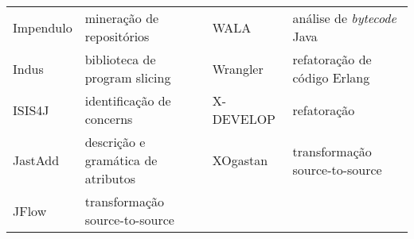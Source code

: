 \begin{table}[h]
{\begin{tabular}{| l | l | l | l |}
  Impendulo      & mineração de repositórios            & WALA             & análise de {\it bytecode} Java       \\
  Indus          & biblioteca de program slicing        & Wrangler         & refatoração de código Erlang         \\
  ISIS4J         & identificação de concerns            & X-DEVELOP        & refatoração                          \\
  JastAdd        & descrição e gramática de atributos   & XOgastan         & transformação source-to-source       \\
  JFlow          & transformação source-to-source       &                  &                                      \\
  \hline
\end{tabular}
\label{resumo-softwares}
}
\end{table}

